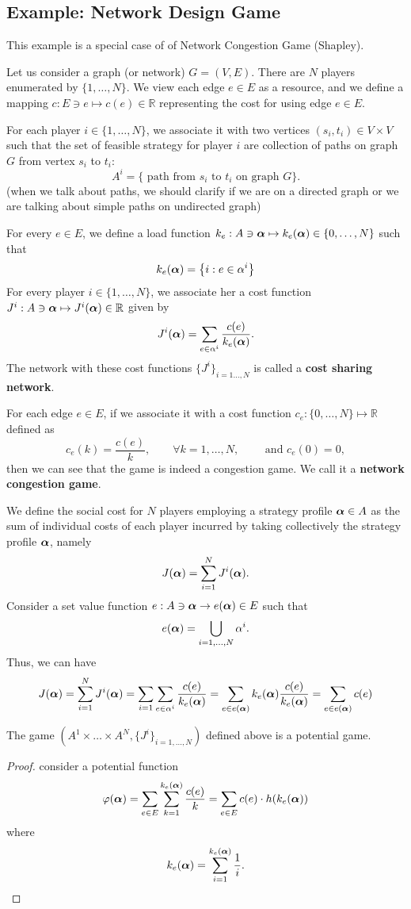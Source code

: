 \subsection{Example: Network Design Game}
This example is a special case of of Network Congestion Game (Shapley).

Let us consider a graph (or network) $G=(V,E)$. There are $N$ players enumerated by $\{1,\ldots,N\}$. We view each edge $e \in E$ as a resource, and we define a mapping $c: E \ni e \mapsto c(e) \in \mathbb{R}$ representing the cost for using edge $e \in E$.

For each player $i \in \{1,\ldots,N\}$, we associate it with two vertices $(s_i, t_i) \in V\times V$ such that the set of feasible strategy for player $i$ are collection of paths  on graph $G$ from vertex $s_i$ to $t_i$:
$$
	A^i = \{ \text{ path from } s_i \text{ to } t_i \text{ on graph } G \}.
$$
{\color{blue} (when we talk about paths, we should clarify if we are on a directed graph or we are talking about simple paths on undirected graph)}

For every $e \in E$, we define a load function  $k_e : A \ni \boldsymbol{\alpha} \mapsto k_e(\boldsymbol{\alpha}) \in \{0,\ldots,N\}$ such that
$$
	k_e(\boldsymbol{\alpha}) = \left\{ i: e\in \alpha^i \right\}
$$
For every player $i \in \{1,\ldots,N\}$, we associate her a cost function $J^i: A \ni \boldsymbol{\alpha} \mapsto J^i(\boldsymbol{\alpha}) \in \mathbb{R}$ given by
$$
	J^i(\boldsymbol{\alpha}) = \sum_{e \in \alpha^i} \frac{ c(e)}{k_e(\boldsymbol{\alpha})}.
$$
The network with these cost functions $\{J^i\}_{i=1\ldots,N}$ is called a \textbf{cost sharing network}. 

For each edge $e\in E$, if we associate it with a cost function $c_e: \{0,\ldots,N\} \mapsto \mathbb{R}$ defined as
$$c_e(k) = \frac{c(e) }{k}, \qquad \forall k = 1,\ldots, N, \qquad \text{ and } c_e(0) = 0,$$
then we can see that the game is indeed a congestion game. We call it a \textbf{network congestion game}.



We define the social cost for $N$ players employing a strategy profile $\boldsymbol{\alpha} \in A$  as the sum of individual costs of each player incurred by taking collectively the strategy profile $\boldsymbol{\alpha}$, namely
$$
	J(\boldsymbol{\alpha}) = \sum_{i=1}^N J^i(\boldsymbol{\alpha}).
$$
Consider a set value function $e: A \ni \boldsymbol{\alpha} \to e(\boldsymbol{\alpha}) \in E$ such that
$$
e(\boldsymbol{\alpha}) = \bigcup_{i=1,\ldots,N} \alpha^i.
$$
Thus, we can have
$$
	J(\boldsymbol{\alpha}) = \sum_{i=1}^N J^i(\boldsymbol{\alpha}) = \sum_{i=1} \sum_{e \in \alpha^i} \frac{c(e)}{k_e(\boldsymbol{\alpha})} = \sum_{ e \in e(\boldsymbol{\alpha})} k_e(\boldsymbol{\alpha}) \frac{c(e)}{k_e(\boldsymbol{\alpha})} = \sum_{e \in e(\boldsymbol{\alpha})} c(e)
$$


\begin{proposition}
	The game $(A^1 \times \ldots \times A^N, \{J^i\}_{i=1,\ldots,N})$ defined above is a potential game.
\end{proposition}
\begin{proof}
	consider a potential function 
	\begin{equation}
		\varphi(\boldsymbol{\alpha}) = \sum_{e \in E} \sum_{k=1}^{k_e(\boldsymbol{\alpha})} \frac{c(e)}{k} = \sum_{e \in E} c(e) \cdot h(k_e(\boldsymbol{\alpha}))
	\end{equation}
	where 
	$$
		k_e(\boldsymbol{\alpha}) = \sum_{i=1}^{k_e(\boldsymbol{\alpha})} \frac{1}{i}.
	$$
\end{proof}
